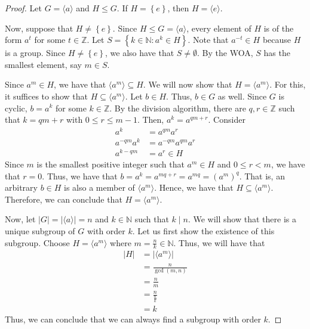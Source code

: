 \begin{proof}
    Let \(G = \langle a \rangle\) and \(H \leq G\). If \(H = \left\{e\right\}\), then \(H = \langle e \rangle\).

    Now, suppose that \(H \neq \left\{e\right\}\). Since \(H \leq G = \langle a \rangle\), every element of \(H\) is of the form \(a^t\) for some \(t \in \mathbb{Z}\). Let \(S = \left\{k \in \mathbb{N} : a^k \in H\right\}\). Note that \(a^{-t} \in H\) because \(H\) is a group. Since \(H \neq \left\{e\right\}\), we also have that \(S \neq \emptyset\). By the WOA, \(S\) has the smallest element, say \(m \in S\).

    Since \(a^m \in H\), we have that \(\langle a^m \rangle \subseteq H\). We will now show that \(H = \langle a^m \rangle\). For this, it suffices to show that \(H \subseteq \langle a^m \rangle\). Let \(b \in H\). Thus, \(b \in G\) as well. Since \(G\) is cyclic, \(b = a^k\) for some \(k \in \mathbb{Z}\). By the division algorithm, there are \(q, r \in \mathbb{Z}\) such that \(k = qm + r\) with \(0 \leq r \leq m-1\). Then, \(a^k = a^{qm+r}\). Consider
    \[
    \begin{aligned}
        a^k &= a^{qm}a^r \\
        a^{-qm}a^k &= a^{-qm}a^{qm}a^r \\
        a^{k - qm} &= a^r \in H
    \end{aligned}
    \]
    Since \(m\) is the smallest positive integer such that \(a^m \in H\) and \(0 \leq r < m\), we have that \(r = 0\). Thus, we have that \(b = a^k = a^{mq+r} = a^{mq} = (a^m)^q\). That is, an arbitrary \(b \in H\) is also a member of \(\langle a^m \rangle\). Hence, we have that \(H \subseteq \langle a^m \rangle\). Therefore, we can conclude that \(H = \langle a^m \rangle\).

    Now, let \(|G| = |\langle a \rangle| = n\) and \(k \in \mathbb{N}\) such that \(k \mid n\). We will show that there is a unique subgroup of \(G\) with order \(k\). Let us first show the existence of this subgroup. Choose \(H = \langle a^m \rangle\) where \(m = \frac{n}{k} \in \mathbb{N}\). Thus, we will have that
    \[
    \begin{aligned}
        |H| &= \left|\langle a^m \rangle\right| \\
            &= \frac{n}{\gcd(m, n)} \\
            &= \frac{n}{m} \\
            &= \frac{n}{\frac{n}{k}} \\
            &= k
    \end{aligned}
    \]
    Thus, we can conclude that we can always find a subgroup with order \(k\).


\end{proof}
